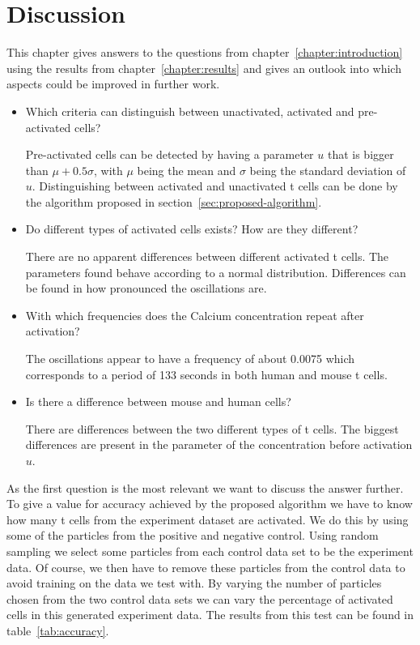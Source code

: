 \chapter{Discussion}
\label{chapter:conclusion}

This chapter gives answers to the questions from chapter~\ref{chapter:introduction} using the results from chapter~\ref{chapter:results} and gives an outlook into which aspects could be improved in further work.

\begin{itemize}
	\item Which criteria can distinguish between unactivated, activated and pre-activated cells?
	
	Pre-activated cells can be detected by having a parameter $u$ that is bigger than $\mu + 0.5 \sigma$, with $\mu$ being the mean and $\sigma$ being the standard deviation of $u$. Distinguishing between activated and unactivated t cells can be done by the algorithm proposed in section~\ref{sec:proposed-algorithm}.
	\item Do different types of activated cells exists? How are they different?
	
	There are no apparent differences between different activated t cells. The parameters found behave according to a normal distribution. Differences can be found in how pronounced the oscillations are.
	\item With which frequencies does the Calcium concentration repeat after activation?
	
	The oscillations appear to have a frequency of about 0.0075 which corresponds to a period of 133 seconds in both human and mouse t cells.
	\item Is there a difference between mouse and human cells?
	
	There are differences between the two different types of t cells. The biggest differences are present in the parameter of the \Calcium concentration before activation $u$.
\end{itemize}

As the first question is the most relevant we want to discuss the answer further. To give a value for accuracy achieved by the proposed algorithm we have to know how many t cells from the experiment dataset are activated. We do this by using some of the particles from the positive and negative control. Using random sampling we select some particles from each control data set to be the experiment data. Of course, we then have to remove these particles from the control data to avoid training on the data we test with. By varying the number of particles chosen from the two control data sets we can vary the percentage of activated cells in this generated experiment data. The results from this test can be found in table~\ref{tab:accuracy}.


